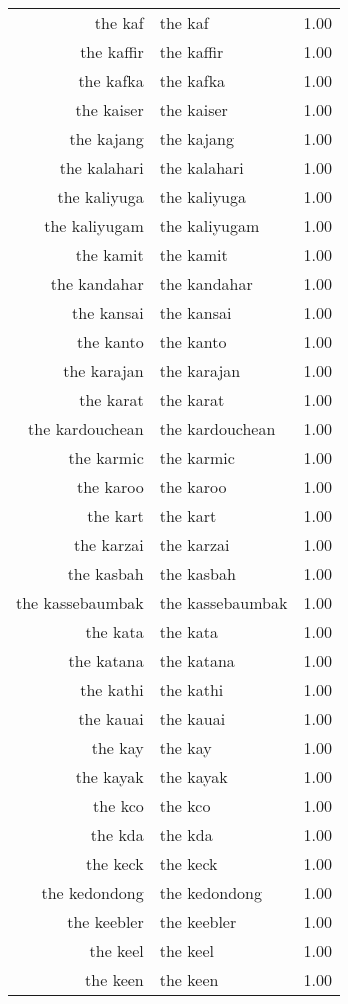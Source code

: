 \begin{table}[ht]
\begin{tabular}{rlr}
  the kaf & the kaf & 1.00 \\ 
  the kaffir & the kaffir & 1.00 \\ 
  the kafka & the kafka & 1.00 \\ 
  the kaiser & the kaiser & 1.00 \\ 
  the kajang & the kajang & 1.00 \\ 
  the kalahari & the kalahari & 1.00 \\ 
  the kaliyuga & the kaliyuga & 1.00 \\ 
  the kaliyugam & the kaliyugam & 1.00 \\ 
  the kamit & the kamit & 1.00 \\ 
  the kandahar & the kandahar & 1.00 \\ 
  the kansai & the kansai & 1.00 \\ 
  the kanto & the kanto & 1.00 \\ 
  the karajan & the karajan & 1.00 \\ 
  the karat & the karat & 1.00 \\ 
  the kardouchean & the kardouchean & 1.00 \\ 
  the karmic & the karmic & 1.00 \\ 
  the karoo & the karoo & 1.00 \\ 
  the kart & the kart & 1.00 \\ 
  the karzai & the karzai & 1.00 \\ 
  the kasbah & the kasbah & 1.00 \\ 
  the kassebaumbak & the kassebaumbak & 1.00 \\ 
  the kata & the kata & 1.00 \\ 
  the katana & the katana & 1.00 \\ 
  the kathi & the kathi & 1.00 \\ 
  the kauai & the kauai & 1.00 \\ 
  the kay & the kay & 1.00 \\ 
  the kayak & the kayak & 1.00 \\ 
  the kco & the kco & 1.00 \\ 
  the kda & the kda & 1.00 \\ 
  the keck & the keck & 1.00 \\ 
  the kedondong & the kedondong & 1.00 \\ 
  the keebler & the keebler & 1.00 \\ 
  the keel & the keel & 1.00 \\ 
  the keen & the keen & 1.00 \\ 

\end{tabular}
\end{table}
